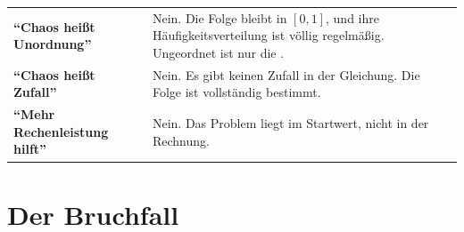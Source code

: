 \begin{warnung}
\begin{center}
{\small
\renewcommand{\arraystretch}{1.52}
\begin{tabular}{@{}P{2.8cm}P{5.8cm}@{}}
\toprule
\textbf{\enquote{Chaos heißt Unordnung}} & Nein. Die Folge bleibt in $[0,1]$, und ihre Häufigkeitsverteilung ist völlig regelmäßig. Ungeordnet ist nur die .\\
\textbf{\enquote{Chaos heißt Zufall}} & Nein. Es gibt keinen Zufall in der Gleichung. Die Folge ist vollständig bestimmt.\\
\textbf{\enquote{Mehr Rechenleistung hilft}} & Nein. Das Problem liegt im Startwert, nicht in der Rechnung.\\
\bottomrule
\end{tabular}}
\end{center}

\begin{center}
\begin{minipage}{0.88\textwidth}
\end{minipage}
\end{center}
\end{warnung}

\section{Der Bruchfall}

